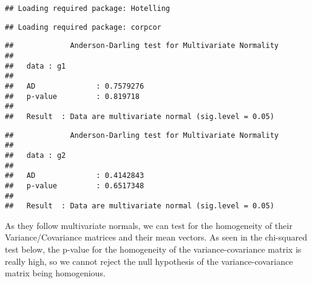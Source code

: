 \documentclass[]{article}
\newenvironment{Shaded}{\begin{snugshade}}{\end{snugshade}}
\newcommand{\KeywordTok}[1]{\textcolor[rgb]{0.13,0.29,0.53}{\textbf{#1}}}
\newcommand{\DataTypeTok}[1]{\textcolor[rgb]{0.13,0.29,0.53}{#1}}
\newcommand{\DecValTok}[1]{\textcolor[rgb]{0.00,0.00,0.81}{#1}}
\newcommand{\CommentTok}[1]{\textcolor[rgb]{0.56,0.35,0.01}{\textit{#1}}}
\newcommand{\OtherTok}[1]{\textcolor[rgb]{0.56,0.35,0.01}{#1}}
\newcommand{\OperatorTok}[1]{\textcolor[rgb]{0.81,0.36,0.00}{\textbf{#1}}}
\newcommand{\NormalTok}[1]{#1}
\begin{document}
\begin{verbatim}
## Loading required package: Hotelling
\end{verbatim}

\begin{verbatim}
## Loading required package: corpcor
\end{verbatim}

\begin{Shaded}
\end{Shaded}

\begin{verbatim}
##             Anderson-Darling test for Multivariate Normality 
## 
##   data : g1 
## 
##   AD              : 0.7579276 
##   p-value         : 0.819718 
## 
##   Result  : Data are multivariate normal (sig.level = 0.05)
\end{verbatim}

\begin{Shaded}
\end{Shaded}

\begin{verbatim}
##             Anderson-Darling test for Multivariate Normality 
## 
##   data : g2 
## 
##   AD              : 0.4142843 
##   p-value         : 0.6517348 
## 
##   Result  : Data are multivariate normal (sig.level = 0.05)
\end{verbatim}

As they follow multivariate normals, we can test for the homogeneity of
their Variance/Covariance matrices and their mean vectors. As seen in
the chi-squared test below, the p-value for the homogeneity of the
variance-covariance matrix is really high, so we cannot reject the null
hypothesis of the variance-covariance matrix being homogenious.
\end{document}
